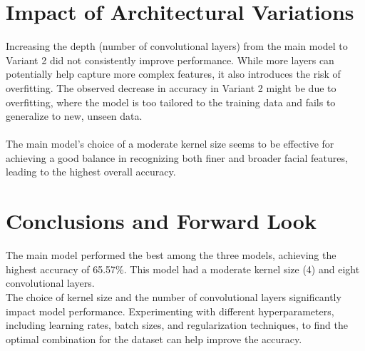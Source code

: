 \section{Impact of Architectural Variations}
\noindent Increasing the depth (number of convolutional layers) from the main model to Variant 2 did not consistently improve performance. While more layers can potentially help capture more complex features, it also introduces the risk of overfitting. The observed decrease in accuracy in Variant 2 might be due to overfitting, where the model is too tailored to the training data and fails to generalize to new, unseen data.\\\\
\noindent The main model's choice of a moderate kernel size seems to be effective for achieving a good balance in recognizing both finer and broader facial features, leading to the highest overall accuracy.

\section{Conclusions and Forward Look}
\noindent The main model performed the best among the three models, achieving the highest accuracy of 65.57\%. This model had a moderate kernel size (4) and eight convolutional layers.\\

\noindent The choice of kernel size and the number of convolutional layers significantly impact model performance.  Experimenting with different hyperparameters, including learning rates, batch sizes, and regularization techniques, to find the optimal combination for the dataset can help improve the accuracy.

